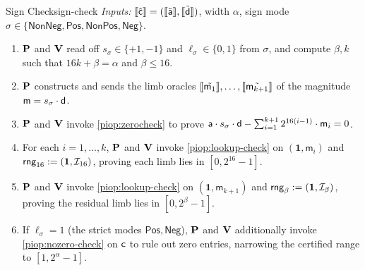 \begin{DefinePIOP}{Sign Check}{sign-check}
  \emph{Inputs:} $\llbracket\hat{\mathsf{c}}\rrbracket = (\llbracket\tilde{\mathsf{a}}\rrbracket, \llbracket\tilde{\mathsf{d}}\rrbracket)$, width $\alpha$, sign mode $\sigma \in \{\mathsf{NonNeg}, \mathsf{Pos}, \mathsf{NonPos}, \mathsf{Neg}\}$.
  \begin{enumerate}[nosep]
    \item $\bf{P}$ and $\bf{V}$ read off $s_\sigma \in \{+1,-1\}$ and $\ell_\sigma \in \{0,1\}$ from $\sigma$, and compute $\beta, k$ such that $16k + \beta = \alpha$ and $\beta \leq 16$.
    \item $\bf{P}$ constructs and sends the limb oracles $\llbracket\tilde{\mathsf{m}_1}\rrbracket, \ldots, \llbracket\tilde{\mathsf{m}_{k+1}}\rrbracket$ of the magnitude $\mathsf{m} = s_\sigma\cdot\mathsf{d}$.
    \item $\bf{P}$ and $\bf{V}$ invoke \cref{piop:zerocheck} to prove $\mathsf{a}\cdot s_\sigma\cdot\mathsf{d} - \sum_{i=1}^{k+1} 2^{16(i-1)}\cdot\mathsf{m}_i = 0$.
    \item For each $i = 1, \dots, k$, $\bf{P}$ and $\bf{V}$ invoke \cref{piop:lookup-check} on $(\mathbf{1}, \mathsf{m}_i)$ and $\mathsf{rng}_{16} := (\mathbf{1}, \mathcal{I}_{16})$, proving each limb lies in $[0, 2^{16}-1]$.
    \item $\bf{P}$ and $\bf{V}$ invoke \cref{piop:lookup-check} on $(\mathbf{1}, \mathsf{m}_{k+1})$ and $\mathsf{rng}_\beta := (\mathbf{1}, \mathcal{I}_\beta)$, proving the residual limb lies in $[0, 2^\beta-1]$.
    \item If $\ell_\sigma = 1$ (the strict modes $\mathsf{Pos}, \mathsf{Neg}$), $\bf{P}$ and $\bf{V}$ additionally invoke \cref{piop:nozero-check} on $\mathsf{c}$ to rule out zero entries, narrowing the certified range to $[1, 2^\alpha - 1]$.
  \end{enumerate}
\end{DefinePIOP}

